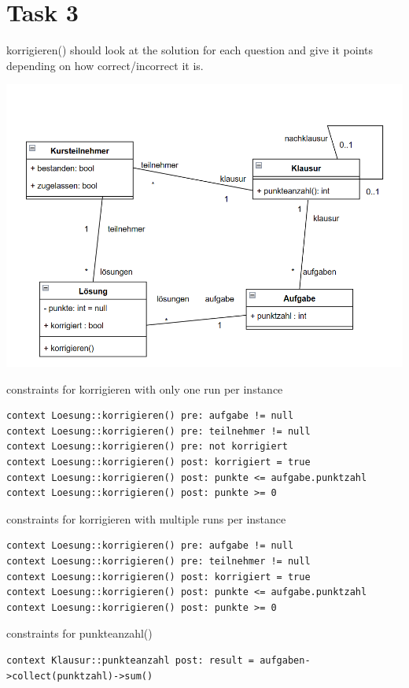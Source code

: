 \chapter{Task 3}
\UseRawInputEncoding
\begin{parlist}
 \item korrigieren() should look at the solution for each question and give it points depending on how correct/incorrect it is.

 \includegraphics[width=\textwidth]{Immagini/aufg3}

 \item constraints for korrigieren with only one run per instance
 \begin{lstlisting}[language=OCL,frame=trBL]
context Loesung::korrigieren() pre: aufgabe != null
context Loesung::korrigieren() pre: teilnehmer != null
context Loesung::korrigieren() pre: not korrigiert
context Loesung::korrigieren() post: korrigiert = true
context Loesung::korrigieren() post: punkte <= aufgabe.punktzahl
context Loesung::korrigieren() post: punkte >= 0
\end{lstlisting}

 \item constraints for korrigieren with multiple runs per instance
\begin{lstlisting}[language=OCL, frame=trBL]
context Loesung::korrigieren() pre: aufgabe != null
context Loesung::korrigieren() pre: teilnehmer != null
context Loesung::korrigieren() post: korrigiert = true
context Loesung::korrigieren() post: punkte <= aufgabe.punktzahl
context Loesung::korrigieren() post: punkte >= 0
\end{lstlisting}

 \item constraints for punkteanzahl()
\begin{lstlisting}[language=OCL, frame=trBL]
context Klausur::punkteanzahl post: result = aufgaben->collect(punktzahl)->sum()
\end{lstlisting}

\end{parlist}

